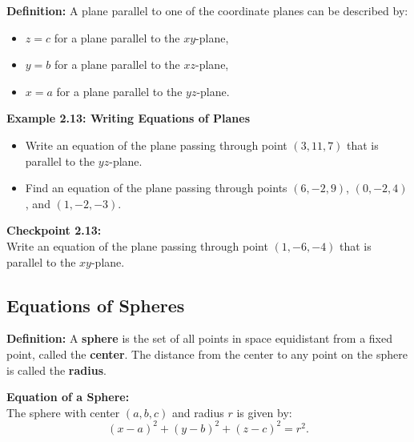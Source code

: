 \documentclass{article}
\begin{document}
\begin{definitionbox}
    \textbf{Definition:} A plane parallel to one of the coordinate planes can be described by:
    \begin{itemize}
        \item \(z = c\) for a plane parallel to the \(xy\)-plane,
        \item \(y = b\) for a plane parallel to the \(xz\)-plane,
        \item \(x = a\) for a plane parallel to the \(yz\)-plane.
    \end{itemize}
\end{definitionbox}

\begin{examplebox}
    \textbf{Example 2.13: Writing Equations of Planes} \\
    \begin{itemize}
        \item Write an equation of the plane passing through point \((3, 11, 7)\) that is parallel to the \(yz\)-plane.
        \item Find an equation of the plane passing through points \((6, -2, 9)\), \((0, -2, 4)\), and \((1, -2, -3)\).
    \end{itemize}
\end{examplebox}

\begin{exercisebox}
    \textbf{Checkpoint 2.13:} \\
    Write an equation of the plane passing through point \((1, -6, -4)\) that is parallel to the \(xy\)-plane.
\end{exercisebox}

\subsection*{Equations of Spheres}

\begin{definitionbox}
    \textbf{Definition:} A \textbf{sphere} is the set of all points in space equidistant from a fixed point, called the \textbf{center}. The distance from the center to any point on the sphere is called the \textbf{radius}.
\end{definitionbox}

\begin{theorembox}
    \textbf{Equation of a Sphere:} \\
    The sphere with center \((a, b, c)\) and radius \(r\) is given by:
    \[
    (x - a)^2 + (y - b)^2 + (z - c)^2 = r^2.
    \]
\end{theorembox}
\end{document}
